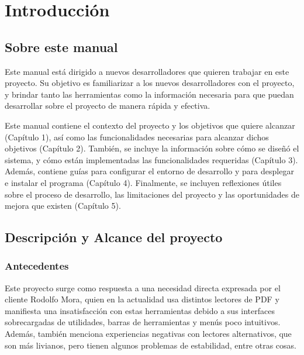 \chapter{Introducción}
\label{sec:intro}

\section{Sobre este manual}

Este manual está dirigido a nuevos desarrolladores que quieren trabajar en este proyecto. Su objetivo es familiarizar a los nuevos desarrolladores con el proyecto, y brindar tanto las herramientas como la información necesaria para que puedan desarrollar sobre el proyecto de manera rápida y efectiva.

Este manual contiene el contexto del proyecto y los objetivos que quiere alcanzar (Capítulo 1), así como las funcionalidades necesarias para alcanzar dichos objetivos (Capítulo 2). También, se incluye la información sobre cómo se diseñó el sistema, y cómo están implementadas las funcionalidades requeridas (Capítulo 3). Además, contiene guías para configurar el entorno de desarrollo y para desplegar e instalar el programa (Capítulo 4). Finalmente, se incluyen reflexiones útiles sobre el proceso de desarrollo, las limitaciones del proyecto y las oportunidades de mejora que existen (Capítulo 5).

\section{Descripción y Alcance del proyecto}
\subsection{Antecedentes}


Este proyecto surge como respuesta a una necesidad directa expresada por el cliente Rodolfo Mora, quien en la actualidad usa distintos lectores de PDF y manifiesta una insatisfacción con estas herramientas debido a sus interfaces sobrecargadas de utilidades, barras de herramientas y menús poco intuitivos. Además, también menciona experiencias negativas con lectores alternativos, que son más livianos, pero tienen algunos problemas de estabilidad, entre otras cosas.

